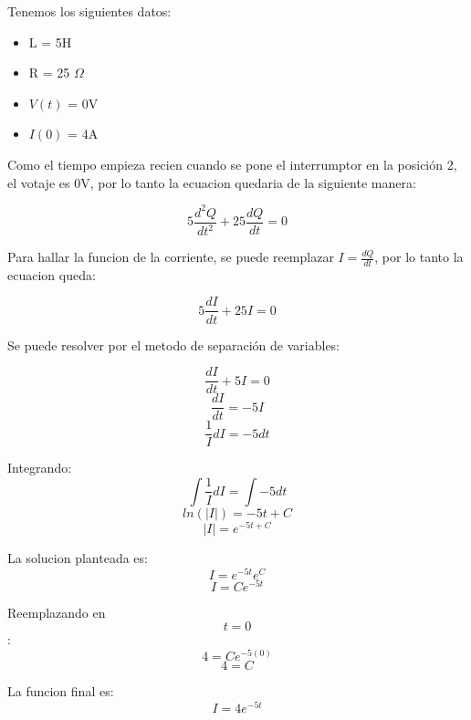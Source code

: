     \sol
    \newline
    Tenemos los siguientes datos:
    \begin{itemize}
        \item L = 5H
        \item R = 25 $\Omega$
        \item $V(t)$ = 0V
        \item $I(0)$ = 4A
    \end{itemize}

    Como el tiempo empieza recien cuando se pone el interrumptor en la posición 2, el votaje es 0V, por lo tanto la 
    ecuacion quedaria de la siguiente manera:

    $$ 5\frac{d^2Q}{dt^2} + 25\frac{dQ}{dt} = 0$$

    Para hallar la funcion de la corriente, se puede reemplazar $I = \frac{dQ}{dt}$, por lo tanto la ecuacion queda:

    $$ 5\frac{dI}{dt} + 25I = 0$$

    Se puede resolver por el metodo de separación de variables:

    $$ \frac{dI}{dt} + 5I = 0 $$
    $$ \frac{dI}{dt} = -5I $$
    $$ \frac{1}{I}dI = -5dt $$
    
    Integrando:
    $$ \int{\frac{1}{I}dI} = \int{-5dt} $$
    $$ ln(|I|) = -5t + C $$
    $$ |I| = e^{-5t + C} $$
    
    La solucion planteada es:
    $$ I = e^{-5t}e^{C} $$
    $$ I = Ce^{-5t} $$

    Reemplazando en $$ t = 0 $$:
    $$ 4 = Ce^{-5(0)} $$
    $$ 4 = C $$

    La funcion final es:
    $$ I = 4e^{-5t} $$

